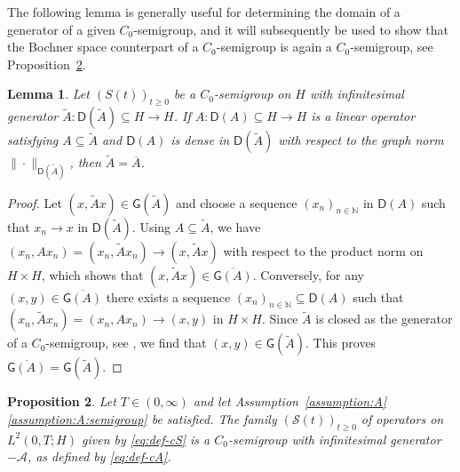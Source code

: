 \documentclass[reqno]{amsart}
\numberwithin{equation}{section}
\newcommand{\N}{\mathbb{N}}
\newcommand{\cA}{\mathcal{A}}
\newcommand{\from}{\colon}
\newcommand{\clos}[1]{\overline{ #1 }}
\newtheorem{lemma}{Lemma}[section]
\newtheorem{proposition}[lemma]{Proposition}
\theoremstyle{remark}
\theoremstyle{definition}
\begin{document}
The following lemma is generally useful for determining 
the domain of a generator of a given $C_0$-semigroup, 
and it will subsequently be used 
to show that the Bochner space counterpart 
of a $C_0$-semigroup  
is again a $C_0$-semigroup, 
see Proposition~\ref{prop:curly-A-semigroup}. 

\begin{lemma}\label{lem:generators}
	Let $(S(t))_{t\ge0}$ be a $C_0$-semigroup on $H$ 
	with infinitesimal generator 
	$\widetilde A \from \mathsf D(\widetilde A)\subseteq H \to H$. 
	If $A\from \mathsf D(A)\subseteq H\to H$ is 
	a linear operator satisfying $A \subseteq \widetilde{A}$ 
	and $\mathsf D(A)$ is dense in $\mathsf D(\widetilde{A})$ 
	with respect to the graph norm 
	$\| \cdot \|_{\mathsf D(\widetilde{A})}$, 
	then $\widetilde A = \clos A$. 
\end{lemma}

\begin{proof}
	Let $(x, \widetilde{A}x) \in \mathsf G(\widetilde{A})$  
	and choose a sequence $(x_n)_{n\in\N}$ in $\mathsf D(A)$ 
	such that ${x_n \to x}$ in 
	$\mathsf D(\widetilde{A})$.
	Using $A \subseteq \widetilde{A}$, we have
	$(x_n, Ax_n) = (x_n, \widetilde{A}x_n) \to (x, \widetilde A x)$ 
	with respect to the product norm on $H \times H$,
	which shows that $(x, \widetilde{A}x) \in \clos{\mathsf G(A)}$.
	Conversely, for any $(x, y) \in \clos{\mathsf G(A)}$
	there exists a sequence $(x_n)_{n\in\N}\subseteq \mathsf D(A)$
	such that
	$(x_n, \widetilde{A}x_n) = (x_n, Ax_n) \to (x,y)$ in $H \times H$.
	Since $\widetilde A$ is closed
	as the generator of a $C_0$-semigroup, 
	see \cite[Theorem~II.1.4]{Engel1999}, 
	we find that $(x,y) \in \mathsf G(\widetilde{A})$.
	This proves $\clos{\mathsf G(A)} = \mathsf G(\widetilde{A})$.
\end{proof}


\begin{proposition}\label{prop:curly-A-semigroup}
	Let $T\in(0,\infty)$ and 
	let Assumption~\textup{\ref{assumption:A}\ref{assumption:A:semigroup}} 
	be satisfied. 
	The family $(\mathcal S(t))_{t\ge0}$ of operators on $L^2(0,T;H)$ 
	given by \eqref{eq:def-cS} is a $C_0$-semigroup 
	with infinitesimal generator $-\cA$, as defined by \eqref{eq:def-cA}.
\end{proposition}
\end{document}
